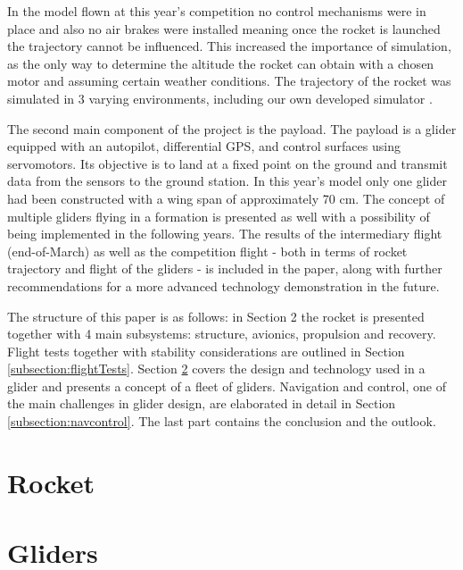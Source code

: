 \documentclass[]{iac}
\begin{document}
In the model flown at this year's competition no control mechanisms were in place and also no air brakes were installed meaning once the rocket is launched the trajectory cannot be influenced. This increased the importance of simulation, as the only way to determine the altitude the rocket can obtain with a chosen motor and assuming certain weather conditions.  The trajectory of the rocket was simulated in 3 varying environments, including our own developed simulator  \cite{sim_hassan}.



The second main component of the project is the payload. The payload is a glider equipped with an autopilot, differential GPS, and control surfaces using servomotors. Its objective is to land at a fixed point on the ground and transmit data from the sensors to the ground station. In this year's model only one glider had been constructed with a wing span of approximately 70 cm. The concept of multiple gliders flying in a formation is presented as well with a possibility of being implemented in the following years.
The results of the intermediary flight (end-of-March) as well as the competition flight - both in terms of rocket trajectory and flight of the gliders - is included in the paper, along with further recommendations for a more advanced technology demonstration in the future.

The structure of this paper is as follows: in Section 2 the rocket is presented together with 4 main subsystems: structure, avionics, propulsion and recovery. Flight tests together with stability considerations are outlined in Section \ref{subsection:flightTests}.  Section \ref{section:gliders}  covers the design and technology used in a glider and presents a concept of a fleet of gliders. Navigation and control, one of the main challenges in glider design, are elaborated in detail in Section \ref{subsection:navcontrol}. The last part contains the conclusion and the outlook.


\section{Rocket}




\section{Gliders}
\label{section:gliders}
\end{document}
